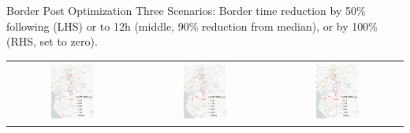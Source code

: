 \documentclass[aspectratio=169,xcolor=dvipsnames]{beamer}
\begin{document}
\begin{frame}{Border Post Optimization}
\vspace{-2mm}
Three Scenarios: Border time reduction by 50\% following \citet{fontagne2023trade} (LHS) or to 12h (middle, 90\% reduction from median), or by 100\% (RHS, set to zero). 
\begin{adjustbox}{center}
\begin{tabular}{@{}c@{}c@{}@{}c@{}} 
\includegraphics[width=0.38\textwidth, trim= {0.9cm 0 0.9cm 0}, clip]{"../figures/PE/trans_CEMAC_network_MACR_bt_50perc_red_perc_google.pdf"} & 
\includegraphics[width=0.38\textwidth, trim= {0.9cm 0 0.9cm 0}, clip]{"../figures/PE/trans_CEMAC_network_MACR_bt_90percto12h_red_perc_google.pdf"} & 
\includegraphics[width=0.38\textwidth, trim= {0.9cm 0 0.9cm 0}, clip]{"../figures/PE/trans_CEMAC_network_MACR_bt_100perc_red_perc_google.pdf"}
\end{tabular}
\end{adjustbox}
\end{frame}
\end{document}
